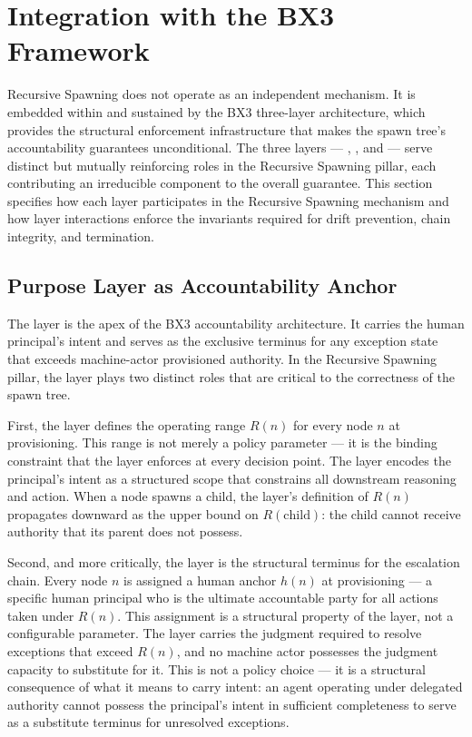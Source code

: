 \section{Integration with the BX3 Framework}
\label{sec:rs-integration}

Recursive Spawning does not operate as an independent mechanism. It is embedded
within and sustained by the BX3 three-layer architecture, which provides the
structural enforcement infrastructure that makes the spawn tree's accountability
guarantees unconditional.  The three layers — \purpose{}, \bounds{}, and
\fact{} — serve distinct but mutually reinforcing roles in the Recursive
Spawning pillar, each contributing an irreducible component to the overall
guarantee.  This section specifies how each layer participates in the Recursive
Spawning mechanism and how layer interactions enforce the invariants required
for drift prevention, chain integrity, and termination.

\subsection{Purpose Layer as Accountability Anchor}
\label{sec:purpose-layer-anchor}

The \purpose{} layer is the apex of the BX3 accountability architecture.  It
carries the human principal's intent and serves as the exclusive terminus for any
exception state that exceeds machine-actor provisioned authority.  In the
Recursive Spawning pillar, the \purpose{} layer plays two distinct roles that are
critical to the correctness of the spawn tree.

First, the \purpose{} layer defines the operating range $R(n)$ for every node
$n$ at provisioning.  This range is not merely a policy parameter — it is the
binding constraint that the \bounds{} layer enforces at every decision point.
The \purpose{} layer encodes the principal's intent as a structured scope that
constrains all downstream reasoning and action.  When a node spawns a child, the
\purpose{} layer's definition of $R(n)$ propagates downward as the upper bound
on $R(\text{child})$: the child cannot receive authority that its parent does not
possess.

Second, and more critically, the \purpose{} layer is the structural terminus for
the escalation chain.  Every node $n$ is assigned a human anchor $h(n)$ at
provisioning — a specific human principal who is the ultimate accountable party
for all actions taken under $R(n)$.  This assignment is a structural property of
the \purpose{} layer, not a configurable parameter.  The \purpose{} layer
carries the judgment required to resolve exceptions that exceed $R(n)$, and no
machine actor possesses the judgment capacity to substitute for it.  This is not
a policy choice — it is a structural consequence of what it means to carry
intent: an agent operating under delegated authority cannot possess the
principal's intent in sufficient completeness to serve as a substitute terminus
for unresolved exceptions.

